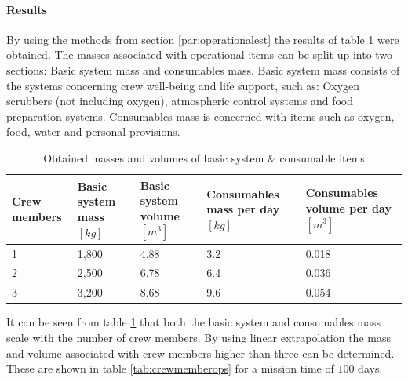 \paragraph{Results}
By using the methods from section \ref{par:operationalest} the results of table \ref{tab:operationalest} were obtained.
The masses associated with operational items can be split up into two sections: Basic system mass and consumables mass. Basic system mass consists of the systems concerning crew well-being and life support, such as: Oxygen scrubbers (not including oxygen), atmospheric control systems and food preparation systems. Consumables mass is concerned with items such as oxygen, food, water and personal provisions.
\begin{table}[h]
	\centering
	\caption{Obtained masses and volumes of basic system \& consumable items}
	\begin{tabular}{|p{2cm}|p{2cm}|p{2cm}|p{2.5cm}|p{2.5cm}|}
		\hline
		\textbf{Crew members} & \textbf{Basic system mass $[kg]$} & \textbf{Basic system volume $[m^{3}]$} & \textbf{Consumables mass per day $[kg]$} & \textbf{Consumables volume per day $[m^{3}]$} \\ \hline \hline
		1 & 1,800 & 4.88 & 3.2 & 0.018 \\
		2 & 2,500 & 6.78 & 6.4 & 0.036 \\
		3 & 3,200 & 8.68 & 9.6 & 0.054 \\
		\hline
	\end{tabular}
	\label{tab:operationalest}
\end{table}
It can be seen from table \ref{tab:operationalest} that both the basic system and consumables mass scale with the number of crew members. By using linear extrapolation the mass and volume associated with crew members higher than three can be determined. These are shown in table \ref{tab:crewmemberops} for a mission time of $100$ days.\\

